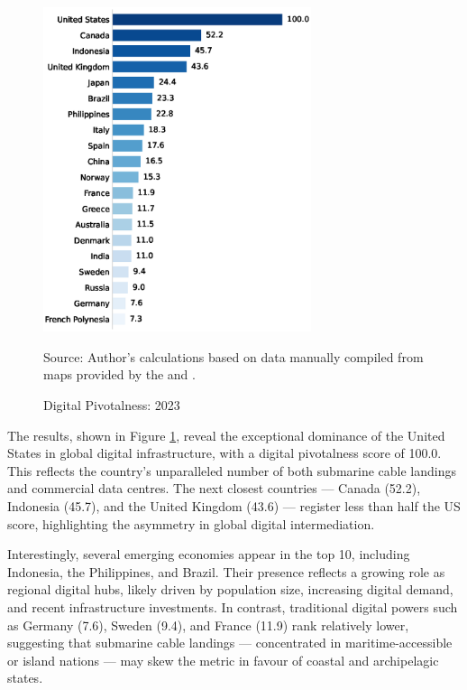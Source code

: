 \documentclass[11pt]{article}
\begin{document}
\begin{figure}[H]
	\caption{Digital Pivotalness: 2023}
	\label{fig:pivotal_digital}
	\centering
        \phantom{a}
	\includegraphics[width=0.7\textwidth]{dataviz/results_pivotal5_snapshot.eps}

	{\footnotesize Source: Author's calculations based on data manually compiled from maps provided by the \citet{datacentermap2023} and \citet{submarinecablemap2023}.}
\end{figure}

The results, shown in Figure \ref{fig:pivotal_digital}, reveal the exceptional dominance of the United States in global digital infrastructure, with a digital pivotalness score of 100.0. This reflects the country's unparalleled number of both submarine cable landings and commercial data centres. The next closest countries — Canada (52.2), Indonesia (45.7), and the United Kingdom (43.6) — register less than half the US score, highlighting the asymmetry in global digital intermediation.

Interestingly, several emerging economies appear in the top 10, including Indonesia, the Philippines, and Brazil. Their presence reflects a growing role as regional digital hubs, likely driven by population size, increasing digital demand, and recent infrastructure investments. In contrast, traditional digital powers such as Germany (7.6), Sweden (9.4), and France (11.9) rank relatively lower, suggesting that submarine cable landings — concentrated in maritime-accessible or island nations — may skew the metric in favour of coastal and archipelagic states.
\end{document}
